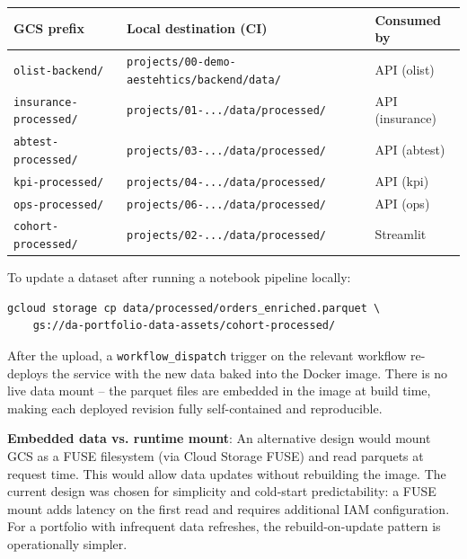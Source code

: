 \begin{center}
\begin{tabular}{lll}
\toprule
\textbf{GCS prefix} & \textbf{Local destination (CI)} & \textbf{Consumed by} \\
\midrule
\texttt{olist-backend/} & \texttt{projects/00-demo-aestehtics/backend/data/} & API (olist) \\
\texttt{insurance-processed/} & \texttt{projects/01-.../data/processed/} & API (insurance) \\
\texttt{abtest-processed/} & \texttt{projects/03-.../data/processed/} & API (abtest) \\
\texttt{kpi-processed/} & \texttt{projects/04-.../data/processed/} & API (kpi) \\
\texttt{ops-processed/} & \texttt{projects/06-.../data/processed/} & API (ops) \\
\texttt{cohort-processed/} & \texttt{projects/02-.../data/processed/} & Streamlit \\
\bottomrule
\end{tabular}
\end{center}

To update a dataset after running a notebook pipeline locally:

\begin{lstlisting}[style=yaml, caption={Uploading updated data to GCS}]
gcloud storage cp data/processed/orders_enriched.parquet \
    gs://da-portfolio-data-assets/cohort-processed/
\end{lstlisting}

After the upload, a \texttt{workflow\_dispatch} trigger on the relevant workflow re-deploys the service with the new data baked into the Docker image. There is no live data mount -- the parquet files are embedded in the image at build time, making each deployed revision fully self-contained and reproducible.

\begin{decisionbox}
\textbf{Embedded data vs. runtime mount}: An alternative design would mount GCS as a FUSE filesystem (via Cloud Storage FUSE) and read parquets at request time. This would allow data updates without rebuilding the image. The current design was chosen for simplicity and cold-start predictability: a FUSE mount adds latency on the first read and requires additional IAM configuration. For a portfolio with infrequent data refreshes, the rebuild-on-update pattern is operationally simpler.
\end{decisionbox}

